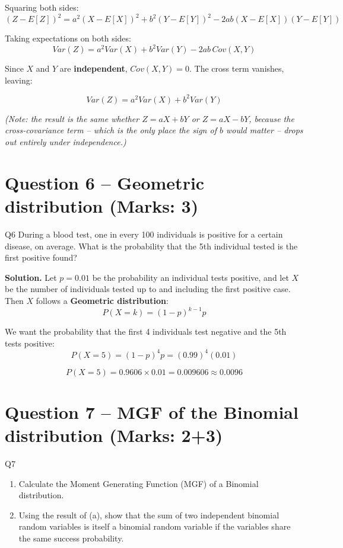 \documentclass[11pt]{article}
\newcommand{\soln}{\par\noindent\textcolor{acolor}{\textbf{Solution.}}\quad}
\begin{document}
Squaring both sides:
\[
(Z-E[Z])^2 = a^2(X-E[X])^2 + b^2(Y-E[Y])^2 - 2ab(X-E[X])(Y-E[Y])
\]

Taking expectations on both sides:
\[
Var(Z) = a^2 Var(X) + b^2 Var(Y) - 2ab\,Cov(X,Y)
\]

Since $X$ and $Y$ are \textbf{independent}, $Cov(X,Y) = 0$. The cross term vanishes, leaving:

\[
\boxed{Var(Z) = a^2Var(X) + b^2Var(Y)}
\]

\textit{(Note: the result is the same whether $Z=aX+bY$ or $Z=aX-bY$, because the cross-covariance term -- which is the only place the sign of $b$ would matter -- drops out entirely under independence.)}

\section{Question 6 -- Geometric distribution (Marks: 3)}
\begin{question}{Q6}
During a blood test, one in every 100 individuals is positive for a certain disease, on average. What is the probability that the 5th individual tested is the first positive found?
\end{question}

\soln
Let $p=0.01$ be the probability an individual tests positive, and let $X$ be the number of individuals tested up to and including the first positive case. Then $X$ follows a \textbf{Geometric distribution}:
\[
P(X=k) = (1-p)^{k-1}p
\]

We want the probability that the first 4 individuals test negative and the 5th tests positive:
\[
P(X=5) = (1-p)^4 p = (0.99)^4(0.01)
\]

\[
\boxed{P(X=5) = 0.9606 \times 0.01 = 0.009606 \approx 0.0096}
\]

\section{Question 7 -- MGF of the Binomial distribution (Marks: 2+3)}
\begin{question}{Q7}
\begin{enumerate}[label=(\alph*)]
\item Calculate the Moment Generating Function (MGF) of a Binomial distribution.
\item Using the result of (a), show that the sum of two independent binomial random variables is itself a binomial random variable if the variables share the same success probability.
\end{enumerate}
\end{question}
\end{document}
